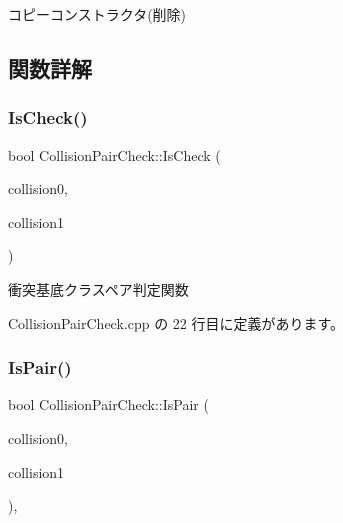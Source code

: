 コピーコンストラクタ(削除) 



\subsection{関数詳解}
\mbox{\label{class_collision_pair_check_aa7603c32ae782ad890280d360ae19dfe}} 
\subsubsection{\texorpdfstring{Is\+Check()}{IsCheck()}}
{\footnotesize\ttfamily bool Collision\+Pair\+Check\+::\+Is\+Check (\begin{DoxyParamCaption}\item[{\mbox{\hyperlink{class_collision_base}{Collision\+Base}} $\ast$}]{collision0,  }\item[{\mbox{\hyperlink{class_collision_base}{Collision\+Base}} $\ast$}]{collision1 }\end{DoxyParamCaption})\hspace{0.3cm}{\ttfamily [static]}}



衝突基底クラスペア判定関数 



 Collision\+Pair\+Check.\+cpp の 22 行目に定義があります。

\mbox{\label{class_collision_pair_check_a52eefe9e5b104075d4c812ca9b68ff16}} 
\subsubsection{\texorpdfstring{Is\+Pair()}{IsPair()}}
{\footnotesize\ttfamily bool Collision\+Pair\+Check\+::\+Is\+Pair (\begin{DoxyParamCaption}\item[{\mbox{\hyperlink{class_collision_base}{Collision\+Base}} $\ast$}]{collision0,  }\item[{\mbox{\hyperlink{class_collision_base}{Collision\+Base}} $\ast$}]{collision1 }\end{DoxyParamCaption})\hspace{0.3cm}{\ttfamily [static]}, {\ttfamily [private]}}



